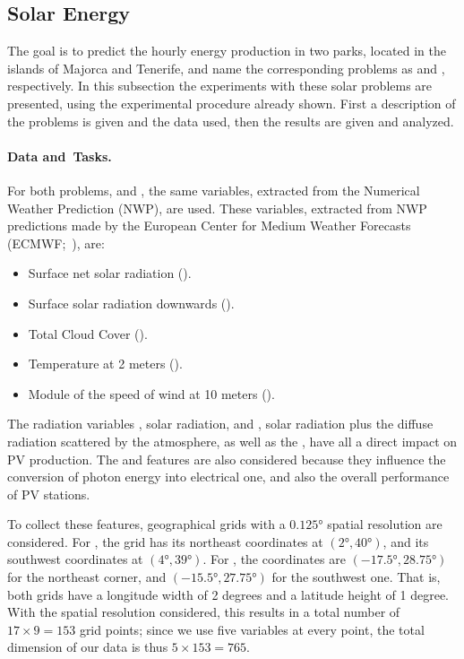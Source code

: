 \subsection{Solar Energy}
The goal is to predict the hourly energy production in two parks, located in the islands of Majorca and Tenerife, and name the corresponding problems as  and , respectively. 
%
In this subsection the experiments with these solar problems are presented, using the experimental procedure already shown. First a description of the problems is given and the data used, then the results are given and analyzed.

\paragraph*{Data and~Tasks.\\}
For both problems,  and , the same variables, extracted from the Numerical Weather Prediction (NWP), are used. These variables, extracted from NWP predictions made by the European Center for Medium Weather Forecasts 
(ECMWF;~\cite{ECMWF}), are:
\begin{itemize}
    \item Surface net solar {radiation} ().
    \item Surface solar radiation {downwards} ().
    \item {Total Cloud Cover} %
     ().
    \item Temperature at 2 {meters} ().
    \item Module of the speed of wind at {10 meters} ().
\end{itemize}
The radiation variables , solar radiation, and , solar radiation plus the diffuse radiation scattered by the atmosphere, as well as the , have all a direct impact on PV production.
%
The  and  features are also considered because they influence the conversion of photon energy into electrical one, and also the overall performance of PV stations.
%

To collect these features, geographical grids with a $\ang{0.125}$ spatial resolution are considered. For , the grid has its northeast coordinates at $(\ang{2}, \ang{40})$, and its southwest coordinates at $(\ang{4}, \ang{39})$. For , the coordinates are $(\ang{-17.5}, \ang{28.75})$ for the northeast corner, and $(\ang{-15.5}, \ang{27.75})$ for the southwest one.
%
That is, both grids have a longitude width of 2 degrees and a latitude height of 1 degree. With the spatial resolution considered, this results in a total number of $17 \times 9 = 153$ grid points; since we use five variables at every point, the total dimension of our data is thus $5 \times 153 = 765$. 


